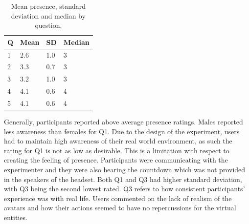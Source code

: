 \begin{table}[H]
\centering
\begin{tabular}{|llll|}
\hline
Q & Mean & SD & Median \\
\hline
1 &  2.6 & 1.0&3\\  
2 &  3.3 & 0.7&3\\ 
3 &  3.2 & 1.0&3\\ 
4 &  4.1 & 0.6&4\\  
5 &  4.1 & 0.6&4\\  
\hline
\end{tabular}
\caption{Mean presence, standard deviation and median by question.}
\label{tbl:pres}
\end{table} 
Generally, participants reported above average presence ratings. Males reported less awareness than females for Q1. Due to the design of the experiment, users had to maintain high awareness of their real world environment, as such the rating for Q1 is not as low as desirable. This is a limitation with respect to creating the feeling of presence. Participants were communicating with the experimenter and they were also hearing the countdown which was not provided in the speakers of the headset. Both Q1 and Q3 had higher standard deviation, with Q3 being the second lowest rated. Q3 refers to how consistent participants' experience was with real life. Users commented on the lack of realism of the avatars and how their actions seemed to have no repercussions for the virtual entities. \\

\clearpage

